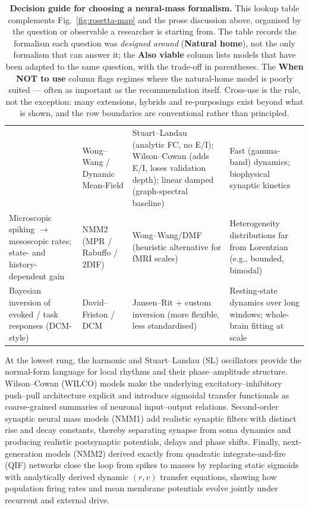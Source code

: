 \documentclass[12pt]{article}
\numberwithin{equation}{section}
\newcommand{\rev}[1]{\begingroup\color{blue}#1\endgroup}
\begin{document}
\begin{table}[!htbp]
\begin{tabularx}{\textwidth}{|p{3.2cm}|p{3.0cm}|Y|p{3.0cm}|}
  & Wong--Wang / Dynamic Mean-Field
  & Stuart--Landau (analytic FC, no E/I); Wilson--Cowan (adds E/I, loses validation depth); linear damped (graph-spectral baseline)
  & Fast (gamma-band) dynamics; biophysical synaptic kinetics \\[3pt]
Microscopic spiking $\to$ mesoscopic rates; state- and history-dependent gain
  & NMM2 (MPR / Rabuffo / 2DIF)
  & Wong--Wang/DMF (heuristic alternative for fMRI scales)
  & Heterogeneity distributions far from Lorentzian (e.g., bounded, bimodal) \\[3pt]
Bayesian inversion of evoked / task responses (DCM-style)
  & David--Friston / DCM
  & Jansen--Rit + custom inversion (more flexible, less standardised)
  & Resting-state dynamics over long windows; whole-brain fitting at scale \\
\hline
\end{tabularx}
\endgroup
\caption{\rev{\textbf{Decision guide for choosing a neural-mass formalism.} This lookup table complements Fig.~\ref{fig:rosetta-map} and the prose discussion above, organised by the question or observable a researcher is starting from. The table records the formalism each question was \emph{designed around} (\textbf{Natural home}), not the only formalism that can answer it; the \textbf{Also viable} column lists models that have been adapted to the same question, with the trade-off in parentheses. The \textbf{When NOT to use} column flags regimes where the natural-home model is poorly suited --- often as important as the recommendation itself. Cross-use is the rule, not the exception: many extensions, hybrids and re-purposings exist beyond what is shown, and the row boundaries are conventional rather than principled.}}
\label{tab:rosetta-guide}
\end{table}

At the lowest rung, the harmonic and Stuart–Landau (SL) oscillators provide the normal-form language for local rhythms and their phase–amplitude structure. Wilson–Cowan (WILCO) models make the underlying excitatory–inhibitory push–pull architecture explicit and introduce sigmoidal transfer functionals as coarse-grained summaries of neuronal input–output relations. Second-order synaptic neural mass models (NMM1) add realistic synaptic filters with distinct rise and decay constants, thereby separating synapse from soma dynamics and producing realistic postsynaptic potentials, delays and phase shifts. Finally, next-generation models (NMM2) derived exactly from quadratic integrate-and-fire (QIF) networks close the loop from spikes to masses by replacing static sigmoids with analytically derived dynamic $(r,v)$ transfer equations, showing how population firing rates and mean membrane potentials evolve jointly under recurrent and external drive.\cite{montbrioMacroscopicDescriptionNetworks2015,coombesNextGenerationNeural2019,byrneNextgenerationNeuralMass2020,clusellaComparisonExactHeuristic2023}
\end{document}
